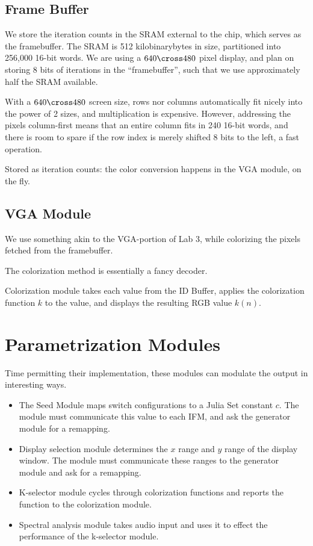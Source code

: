 \documentclass{article}
\begin{document}


\subsection{Frame Buffer}

We store the iteration counts in the SRAM external to the chip, which
serves as the framebuffer. The SRAM is 512 kilobinarybytes in size,
partitioned into 256,000 16-bit words. We are using a $640\cross 480$
pixel display, and plan on storing 8 bits of iterations in the
``framebuffer'', such that we use approximately half the SRAM available.

With a $640\cross 480$ screen size, rows nor columns automatically fit
nicely into the power of 2 sizes, and multiplication is
expensive. However, addressing the pixels column-first means that an
entire column fits in 240 16-bit words, and there is room to spare if
the row index is merely shifted 8 bits to the left, a fast operation.

Stored as iteration counts: the color conversion happens in the VGA
module, on the fly.


\subsection{VGA Module}

We use something akin to the VGA-portion of Lab 3, while colorizing
the pixels fetched from the framebuffer.

The colorization method is essentially a fancy decoder.

Colorization module takes each value from the ID Buffer, applies the
colorization function $k$ to the value, and displays the resulting RGB
value $k(n)$.


\section{Parametrization Modules}

Time permitting their implementation, these modules can modulate the
output in interesting ways.

\begin{itemize}
\item The Seed Module maps switch configurations to a Julia Set
  constant $c$. The module must communicate this value to each IFM, and
  ask the generator module for a remapping.
\item Display selection module determines the $x$ range and $y$ range of
  the display window.  The module must communicate these ranges to the
  generator module and ask for a remapping.
\item K-selector module cycles through colorization functions and
  reports the function to the colorization module.
\item Spectral analysis module takes audio input and uses it to effect
  the performance of the k-selector module.
\end{itemize}
\end{document}
